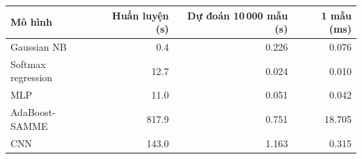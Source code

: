 \begin{tabular}{lrrr}
\toprule
Mô hình & Huấn luyện (s) & Dự đoán 10\,000 mẫu (s) & 1 mẫu (ms) \\
\midrule
Gaussian NB & 0.4 & 0.226 & 0.076 \\
Softmax regression & 12.7 & 0.024 & 0.010 \\
MLP & 11.0 & 0.051 & 0.042 \\
AdaBoost-SAMME & 817.9 & 0.751 & 18.705 \\
CNN & 143.0 & 1.163 & 0.315 \\
\bottomrule
\end{tabular}
